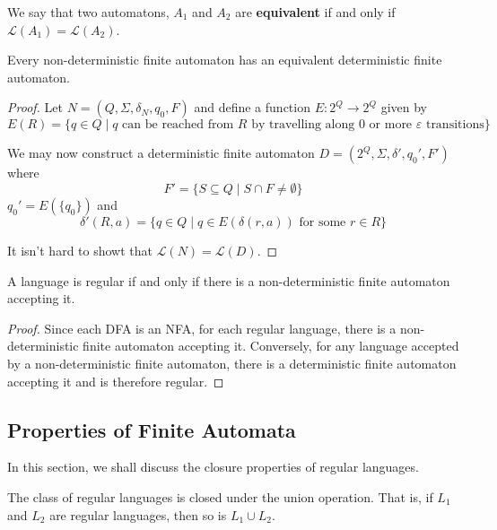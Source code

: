 We say that two automatons, $A_1$ and $A_2$ are \textbf{equivalent} if and only if $\mathcal{L}(A_1) = \mathcal{L}(A_2)$.

\begin{theorem}
    Every non-deterministic finite automaton has an equivalent deterministic finite automaton.
\end{theorem}
\begin{proof}
    Let $N = (Q,\Sigma,\delta_N,q_0,F)$ and define a function $E:2^Q\to2^Q$ given by 
    \begin{equation*}
        E(R) = \{q\in Q\mid \text{$q$ can be reached from $R$ by travelling along 0 or more $\varepsilon$ transitions}\}
    \end{equation*}

    We may now construct a deterministic finite automaton $D = (2^Q, \Sigma, \delta', q_0', F')$ where
    \begin{equation*}
        F' = \{S\subseteq Q\mid S\cap F\ne\emptyset\}
    \end{equation*}
    $q_0' = E(\{q_0\})$ and 
    \begin{equation*}
        \delta'(R, a) = \{q\in Q\mid q\in E(\delta(r, a)) \text{ for some } r\in R\}
    \end{equation*}

    It isn't hard to showt that $\mathcal{L}(N) = \mathcal{L}(D)$.
\end{proof}

\begin{corollary}
    A language is regular if and only if there is a non-deterministic finite automaton accepting it.
\end{corollary}
\begin{proof}
    Since each DFA is an NFA, for each regular language, there is a non-deterministic finite automaton accepting it. Conversely, for any language accepted by a non-deterministic finite automaton, there is a deterministic finite automaton accepting it and is therefore regular.
\end{proof}

\subsection{Properties of Finite Automata}
In this section, we shall discuss the closure properties of regular languages.
\begin{proposition}
    The class of regular languages is closed under the union operation. That is, if $L_1$ and $L_2$ are regular languages, then so is $L_1\cup L_2$.
\end{proposition}

